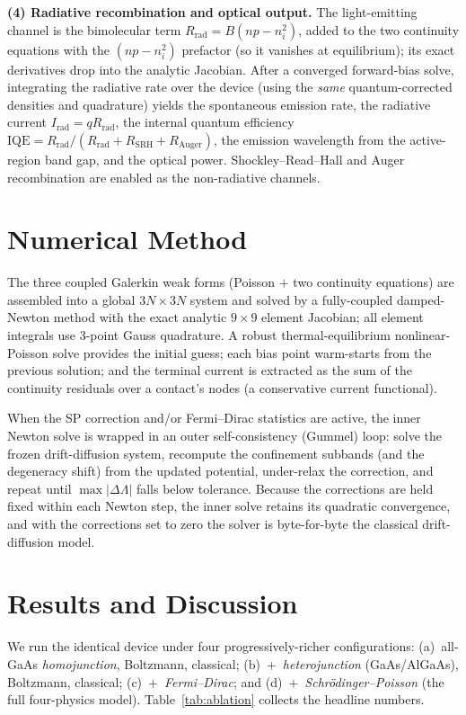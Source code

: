 \documentclass[conference]{IEEEtran}
\begin{document}
\textbf{(4) Radiative recombination and optical output.} The light-emitting
channel is the bimolecular term $R_{\mathrm{rad}}=B(np-n_i^2)$, added to the two
continuity equations with the $(np-n_i^2)$ prefactor (so it vanishes at
equilibrium); its exact derivatives drop into the analytic Jacobian. After a
converged forward-bias solve, integrating the radiative rate over the device
(using the \emph{same} quantum-corrected densities and quadrature) yields the
spontaneous emission rate, the radiative current $I_{\mathrm{rad}}=qR_{\mathrm{rad}}$,
the internal quantum efficiency
$\mathrm{IQE}=R_{\mathrm{rad}}/(R_{\mathrm{rad}}+R_{\mathrm{SRH}}+R_{\mathrm{Auger}})$,
the emission wavelength from the active-region band gap, and the optical power.
Shockley--Read--Hall and Auger recombination are enabled as the non-radiative
channels.

\section{Numerical Method}
The three coupled Galerkin weak forms (Poisson $+$ two continuity equations) are
assembled into a global $3N\times3N$ system and solved by a fully-coupled
damped-Newton method with the exact analytic $9\times9$ element Jacobian; all
element integrals use 3-point Gauss quadrature. A robust thermal-equilibrium
nonlinear-Poisson solve provides the initial guess; each bias point warm-starts
from the previous solution; and the terminal current is extracted as the sum of
the continuity residuals over a contact's nodes (a conservative current
functional).

When the SP correction and/or Fermi--Dirac statistics are active, the inner Newton
solve is wrapped in an outer self-consistency (Gummel) loop: solve the frozen
drift-diffusion system, recompute the confinement subbands (and the degeneracy
shift) from the updated potential, under-relax the correction, and repeat until
$\max|\Delta\Lambda|$ falls below tolerance. Because the corrections are held
fixed within each Newton step, the inner solve retains its quadratic convergence,
and with the corrections set to zero the solver is byte-for-byte the classical
drift-diffusion model.

\section{Results and Discussion}
We run the identical device under four progressively-richer configurations:
(a)~all-GaAs \emph{homojunction}, Boltzmann, classical; (b)~$+$~\emph{heterojunction}
(GaAs/AlGaAs), Boltzmann, classical; (c)~$+$~\emph{Fermi--Dirac}; and
(d)~$+$~\emph{Schr\"odinger--Poisson} (the full four-physics model). Table~\ref{tab:ablation}
collects the headline numbers.
\end{document}
